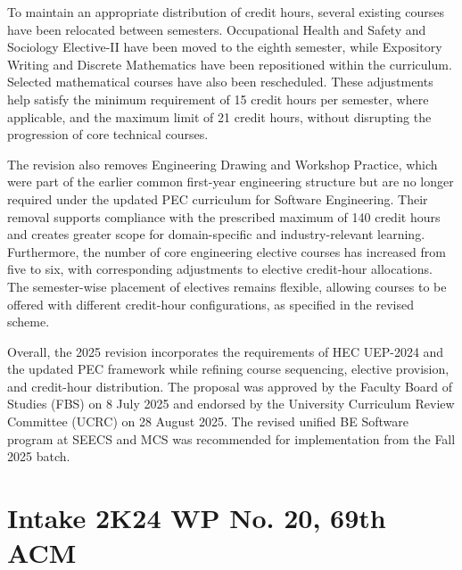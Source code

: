 To maintain an appropriate distribution of credit hours, several existing courses have been relocated between semesters. Occupational Health and Safety and Sociology Elective-II have been moved to the eighth semester, while Expository Writing and Discrete Mathematics have been repositioned within the curriculum. Selected mathematical courses have also been rescheduled. These adjustments help satisfy the minimum requirement of 15 credit hours per semester, where applicable, and the maximum limit of 21 credit hours, without disrupting the progression of core technical courses.

The revision also removes Engineering Drawing and Workshop Practice, which were part of the earlier common first-year engineering structure but are no longer required under the updated PEC curriculum for Software Engineering. Their removal supports compliance with the prescribed maximum of 140 credit hours and creates greater scope for domain-specific and industry-relevant learning. Furthermore, the number of core engineering elective courses has increased from five to six, with corresponding adjustments to elective credit-hour allocations. The semester-wise placement of electives remains flexible, allowing courses to be offered with different credit-hour configurations, as specified in the revised scheme.

Overall, the 2025 revision incorporates the requirements of HEC UEP-2024 and the updated PEC framework while refining course sequencing, elective provision, and credit-hour distribution. The proposal was approved by the Faculty Board of Studies (FBS) on 8 July 2025 and endorsed by the University Curriculum Review Committee (UCRC) on 28 August 2025. The revised unified BE Software program at SEECS and MCS was recommended for implementation from the Fall 2025 batch.

\clearpage
{}
\section{Intake 2K24 WP No. 20, 69th ACM}
\label{app:criteria-3_intake-2k24-wp20}

